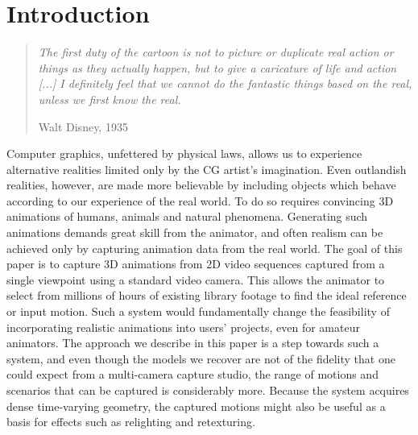 \documentclass[preprint]{acmsiggraph}
\begin{document}

\TOGlinkslist

\copyrightspace

\section{Introduction}

\begin{quotation}
\em
The first duty of the cartoon is not to picture or duplicate real action or things as they actually happen, but to give a caricature of life and action [...]
I definitely feel that we cannot do the fantastic things based on the real, unless we first know the real.
\begin{flushright}
{Walt Disney, 1935}~\cite[page 90]{Girveau:2006:OUAT}
\end{flushright}
\end{quotation}

Computer graphics, unfettered by physical laws, allows us to experience alternative realities limited only by the CG artist's imagination.   Even outlandish realities, however, are made more believable by including objects which behave according to our experience of the real world.   To do so requires convincing 3D animations of humans, animals and natural phenomena.  Generating such animations demands great skill from the animator, and often realism can be achieved only by capturing animation data from the real world.   The goal of this paper is to capture 3D animations from 2D video sequences captured from a single viewpoint using a standard video camera.    This allows the animator to select from millions of hours of existing library footage to find the ideal reference or input motion.  Such a system would fundamentally change the feasibility of incorporating realistic animations into users' projects, even for amateur animators.   The approach we describe in this paper is a step towards such a system, and even though the models we recover are not of the fidelity that one could expect from a multi-camera capture studio, the range of motions and scenarios that can be captured is considerably more.  Because the system acquires dense time-varying geometry, the captured motions might also be useful as a basis for effects such as relighting and retexturing.

\end{document}
